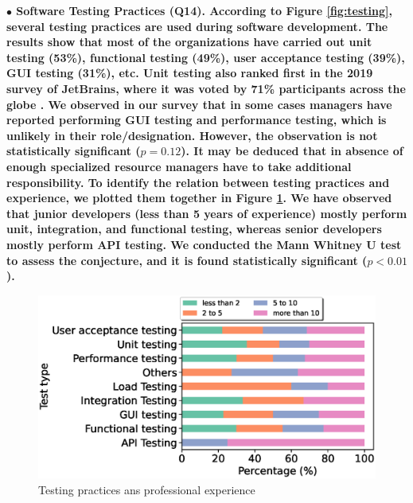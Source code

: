 \nd\bf{$\bullet$ Software Testing Practices (Q14)}. According to Figure \ref{fig:testing}, several testing practices are used during
software development. The results show that most of the organizations have
carried out unit testing (53\%), functional testing (49\%), user acceptance
testing (39\%), GUI testing (31\%), etc. Unit testing also ranked first in the
2019 survey of JetBrains, where it was voted by 71\% participants across the
globe \citep{JetBrains2019}. We observed in our survey that in some cases
managers have reported performing GUI testing and performance testing, which is
unlikely in their role/designation. However, the observation is not
statistically significant ($p=0.12$). It may be deduced that in absence of
enough specialized resource managers have to take additional responsibility. To
identify the relation between testing practices and experience, we plotted them
together in Figure \ref{fig:testing type and experience}. We have observed that
junior developers (less than 5 years of experience) mostly perform unit, integration, and functional testing,
whereas senior developers mostly perform API testing. We conducted the Mann
Whitney U test to assess the conjecture, and it is found statistically
significant ($p<0.01$).

\begin{figure}[h]
\centering
  \includegraphics[scale=0.45]{Figures/Testing_Type_and_Experience}
  \caption{Testing practices ans professional experience}
  \label{fig:testing type and experience}
\end{figure}


